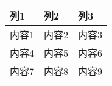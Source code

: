 \documentclass{article}
\begin{document}
\begin{longtable}{@{}p{4cm}p{4cm}p{4cm}@{}}
\toprule
\textbf{列1} & \textbf{列2} & \textbf{列3} \\ 
\midrule
内容1 & 内容2 & 内容3 \\
内容4 & 内容5 & 内容6 \\ 
内容7 & 内容8 & 内容9 \\ 
\bottomrule
\end{longtable}
\end{document}
